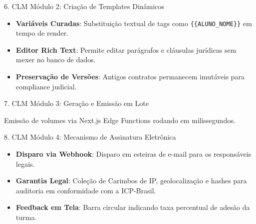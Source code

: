 \documentclass[10pt, aspectratio=169]{beamer}
\begin{document}
\begin{frame}{6. CLM Módulo 2: Criação de Templates Dinâmicos}
    \begin{itemize}
        \item \textbf{Variáveis Curadas}: Substituição textual de tags como \texttt{\{\{ALUNO\_NOME\}\}} em tempo de render.
        \item \textbf{Editor Rich Text}: Permite editar parágrafos e cláusulas jurídicas sem mexer no banco de dados.
        \item \textbf{Preservação de Versões}: Antigos contratos permanecem imutáveis para compliance judicial.
    \end{itemize}
\end{frame}

\begin{frame}{7. CLM Módulo 3: Geração e Emissão em Lote}
    \begin{center}
    \end{center}
    \vspace{0.2cm}
    \begin{tcolorbox}[enhanced,title=Agilidade Operacional,colback=black!30,colframe=ArkosGreen,fonttitle=\bfseries]
        Emissão de volumes via Next.js Edge Functions rodando em milissegundos.
    \end{tcolorbox}
\end{frame}

\begin{frame}{8. CLM Módulo 4: Mecanismo de Assinatura Eletrônica}
    \begin{itemize}
        \item \textbf{Disparo via Webhook}: Disparo em esteiras de e-mail para os responsáveis legais.
        \item \textbf{Garantia Legal}: Coleção de Carimbos de IP, geolocalização e hashes para auditoria em conformidade com a ICP-Brasil.
        \item \textbf{Feedback em Tela}: Barra circular indicando taxa percentual de adesão da turma.
    \end{itemize}
\end{frame}
\end{document}
